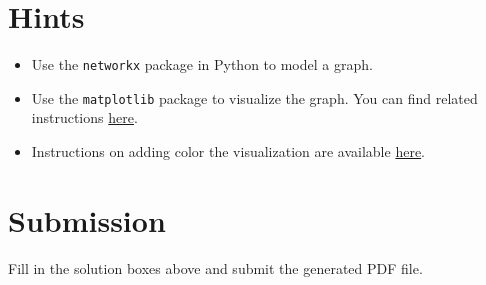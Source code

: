 \documentclass[a4paper]{exam}
\begin{document}
\section*{Hints}
\begin{itemize}
\item Use the \texttt{networkx} package in Python to model a graph.
\item Use the \texttt{matplotlib} package to visualize the graph. You can find related instructions \href{https://www.geeksforgeeks.org/python-visualize-graphs-generated-in-networkx-using-matplotlib/}{here}.
\item Instructions on adding color the visualization are available \href{https://stackoverflow.com/questions/27030473/how-to-set-colors-for-nodes-in-networkx}{here}.
\end{itemize}

\section*{Submission}

Fill in the solution boxes above and submit the generated PDF file.
\end{document}
